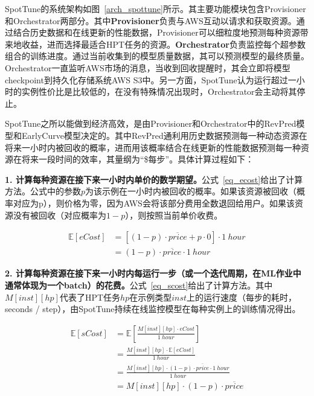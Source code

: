 SpotTune的系统架构如图~\ref{arch_spottune}所示。其主要功能模块包含Provisioner和Orchestrator两部分。其中\textbf{Provisioner}负责与AWS互动以请求和获取资源。通过结合历史数据和在线更新的性能数据，Provisioner可以细粒度地预测每种资源带来地收益，进而选择最适合HPT任务的资源。\textbf{Orchestrator}负责监控每个超参数组合的训练进度。通过当前收集到的模型质量数据，其可以预测模型的最终质量。Orchestrator一直监听AWS市场的消息，当收到回收提醒时，其会立即将模型checkpoint到持久化存储系统AWS S3中。另一方面，SpotTune认为运行超过一小时的实例性价比是比较低的，在没有特殊情况出现时，Orchestrator会主动将其停止。

SpotTune之所以能做到经济高效，是由Provisioner和Orchestrator中的RevPred模型和EarlyCurve模型决定的。其中RevPred通利用历史数据预测每一种动态资源在将来一小时内被回收的概率，进而用该概率结合在线更新的性能数据预测每一种资源在将来一段时间的效率，其量纲为“\$每步”。具体计算过程如下：

\textbf{1. 计算每种资源在接下来一小时内单价的数学期望。}公式~\ref{eq_ecost}给出了计算方法。公式中的参数$p$为该示例在一小时内被回收的概率。如果该资源被回收（概率对应为p），则价格为零，因为AWS会将该部分费用全数退回给用户。如果该资源没有被回收（对应概率为$1-p$），则按照当前单价收费。

\begin{equation}\label{eq_ecost}
	\begin{aligned}
		\mathbb{E}\left[eCost\right] &= [(1-p) \cdot \overline{price} + p \cdot 0] \cdot 1\ hour \\
		&= (1-p) \cdot \overline{price} \cdot 1\ hour
	\end{aligned}
\end{equation}

\textbf{2. 计算每种资源在接下来一小时内每运行一步（或一个迭代周期，在ML作业中通常体现为一个batch）的花费。}公式~\ref{eq_scost}给出了计算方法。其中$M[inst][hp]$代表了HPT任务$hp$在示例类型$inst$上的运行速度（每步的耗时，seconds / step），由SpotTune持续在线监控模型在每种实例上的训练情况得出。

\begin{equation}\label{eq_scost}
	\begin{aligned}
		\mathbb{E}\left[sCost\right] &= \mathbb{E}\left[\frac{M[inst][hp] \cdot eCost}{1\ hour}\right]  \\
		&=\frac{M[inst][hp] \cdot \mathbb{E}\left[eCost\right]}{1\ hour} \\
		&=\frac{M[inst][hp] \cdot (1-p) \cdot \overline{price} \cdot 1\ hour}{1\ hour} \\
		&=M[inst][hp] \cdot (1-p) \cdot \overline{price}
	\end{aligned}
\end{equation}

